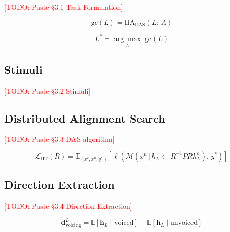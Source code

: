 \documentclass{article}
\newcommand{\gc}{\text{gc}}
\newcommand{\iia}{\text{IIA}}
\newcommand{\Lstar}{L^*}
\newcommand{\todo}[1]{\textcolor{red}{[TODO: #1]}}
\begin{document}

\todo{Paste §3.1 Task Formulation}

\begin{equation}
  \gc(L) = \iia_{\text{DAS}}(L;\, A)
  \label{eq:gc}
\end{equation}

\begin{equation}
  \Lstar = \underset{L}{\arg\max}\; \gc(L)
  \label{eq:lstar}
\end{equation}

\subsection{Stimuli}
\label{sec:stimuli}


\todo{Paste §3.2 Stimuli}

\subsection{Distributed Alignment Search}
\label{sec:das}


\todo{Paste §3.3 DAS algorithm}

\begin{equation}
  \mathcal{L}_{\text{IIT}}(R) =
  \mathbb{E}_{(x^c, x^n, y^*)} \left[
    \ell\!\left(
      \mathcal{M}\!\left(x^n \,\big|\, h_L \leftarrow R^{-1} P R h_L^c \right),\, y^*
    \right)
  \right]
  \label{eq:iit_loss}
\end{equation}

\subsection{Direction Extraction}
\label{sec:direction}


\todo{Paste §3.4 Direction Extraction}

\begin{equation}
  \mathbf{d}_{\text{voicing}}^L =
  \mathbb{E}\!\left[\mathbf{h}_L \mid \text{voiced}\right]
  - \mathbb{E}\!\left[\mathbf{h}_L \mid \text{unvoiced}\right]
  \label{eq:mmprobe}
\end{equation}
\end{document}
